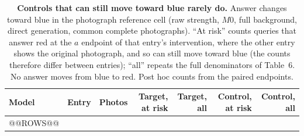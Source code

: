 \begin{table}[t]
\centering\footnotesize
\setlength{\tabcolsep}{5pt}
\renewcommand{\arraystretch}{1.04}
\caption{\textbf{Controls that can still move toward blue rarely do.} Answer changes toward blue in the photograph reference cell (raw strength, $M0$, full background, direct generation, common complete photographs). ``At risk'' counts queries that answer red at the $a$ endpoint of that entry's intervention, where the other entry shows the original photograph, and so can still move toward blue (the counts therefore differ between entries); ``all'' repeats the full denominators of Table~6. No answer moves from blue to red. Post hoc counts from the paired endpoints.}
\label{tab:control_room}
\begin{tabular}{@{}llrrrrr@{}}
\toprule
\rowcolor{DSTableHeader}
Model & Entry & Photos & Target, at risk & Target, all & Control, at risk & Control, all \\
\midrule
@@ROWS@@
\bottomrule
\end{tabular}
\end{table}
